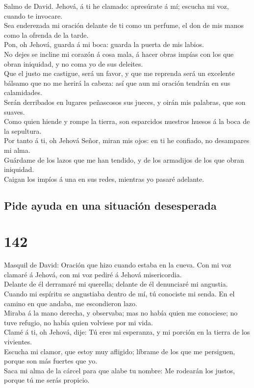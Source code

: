  Salmo de David. Jehová, á ti he clamado: apresúrate á mí;
escucha mi voz, cuando te invocare.\\
 Sea enderezada mi oración delante de ti como un perfume,
el don de mis manos como la ofrenda de la tarde.\\
 Pon, oh Jehová, guarda á mi boca: guarda la puerta de mis
labios.\\
 No dejes se incline mi corazón á cosa mala, á hacer obras
impías con los que obran iniquidad, y no coma yo de sus deleites.\\
 Que el justo me castigue, será un favor, y que me
reprenda será un excelente bálsamo que no me herirá la cabeza: así que
aun mi oración tendrán en sus calamidades.\\
 Serán derribados en lugares peñascosos sus jueces, y
oirán mis palabras, que son suaves.\\
 Como quien hiende y rompe la tierra, son esparcidos
nuestros huesos á la boca de la sepultura.\\
 Por tanto á ti, oh Jehová Señor, miran mis ojos: en ti he
confiado, no desampares mi alma.\\
 Guárdame de los lazos que me han tendido, y de los
armadijos de los que obran iniquidad.\\
 Caigan los impíos á una en sus redes, mientras yo pasaré
adelante.

\hypertarget{pide-ayuda-en-una-situaciuxf3n-desesperada}{%
\subsection{Pide ayuda en una situación
desesperada}\label{pide-ayuda-en-una-situaciuxf3n-desesperada}}

\hypertarget{section-19-142}{%
\section{142}\label{section-19-142}}

 Masquil de David: Oración que hizo cuando estaba en la
cueva. Con mi voz clamaré á Jehová, con mi voz pediré á Jehová
misericordia.\\
 Delante de él derramaré mi querella; delante de él
denunciaré mi angustia.\\
 Cuando mi espíritu se angustiaba dentro de mí, tú
conociste mi senda. En el camino en que andaba, me escondieron lazo.\\
 Miraba á la mano derecha, y observaba; mas no había quien
me conociese; no tuve refugio, no había quien volviese por mi vida.\\
 Clamé á ti, oh Jehová, dije: Tú eres mi esperanza, y mi
porción en la tierra de los vivientes.\\
 Escucha mi clamor, que estoy muy afligido; líbrame de los
que me persiguen, porque son más fuertes que yo.\\
 Saca mi alma de la cárcel para que alabe tu nombre: Me
rodearán los justos, porque tú me serás propicio.

